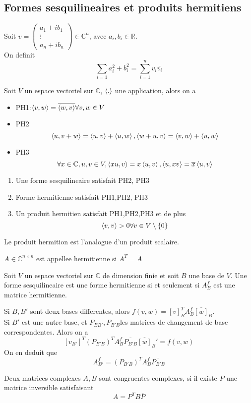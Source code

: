 \documentclass[../main.tex]{subfiles}
\begin{document}
\subsection{Formes sesquilineaires et produits hermitiens}
Soit $v = \begin{pmatrix}
a_1 + ib_1\\ \vdots\\ a_n + i b_n
\end{pmatrix}
\in \mathbb{C}^{n}
$, avec $a_i,b_i \in \mathbb{R}$.\\
On definit
\[ 
\sum_{i=1}^{ } a_i^{2} + b_i^{2} = \sum_{i=1}^{ n} v_i \overline{v_i}
\]
\begin{defn}
Soit $V$ un espace vectoriel sur $\mathbb{C}$, $\left\langle.\right\rangle$ une application, alors on a
\begin{itemize}
\item PH1:$\left\langle v,w\right\rangle = \overline{\left\langle w,v\right\rangle }\forall v,w\in V$ 
\item PH2
	\[ 
	\left\langle u,v+w\right\rangle = \left\langle u,v\right\rangle + \left\langle u,w\right\rangle , \left\langle w+u,v\right\rangle = \left\langle v,w\right\rangle + \left\langle u,w\right\rangle 
	\]
	
\item PH3
\[ 
\forall x \in \mathbb{C}, u,v \in V, \left\langle xu ,v\right\rangle = x\left\langle u,v\right\rangle , \left\langle u,xv\right\rangle = \overline{x} \left\langle u,v\right\rangle 
\]

\end{itemize}
\begin{enumerate}
\item Une forme sesquilineaire satisfait PH2, PH3
\item Forme hermitienne satisfait PH1,PH2, PH3
\item Un produit hermitien satisfait PH1,PH2,PH3 et de plus
	 \[ 
	\left\langle v,v\right\rangle >0 \forall v \in V \setminus \left\{ 0 \right\} 
	\]
	
\end{enumerate}
Le produit hermition est l'analogue d'un produit scalaire.
\end{defn}
\begin{defn}
	$A \in \mathbb{C}^{n \times n} $ est appellee hermitienne si $A^{T}= \overline{A}$
\end{defn}
\begin{propo}
	Soit $V$ un espace vectoriel sur $\mathbb{C}$ de dimension finie et soit $B $ une base de $V$. Une forme sesquilineaire est une forme hermitienne si et seulement si $A_B^{f}$ est une matrice hermitienne.
\end{propo}
Si $B,B'$ sont deux bases differentes, alors $f( v,w) = [ v] _B^{T} A_B^{f}\overline{ [ w] }_B$.\\
Si $B'$ est une autre base, et $P_{BB'} , P_{B'B} $les matrices de changement de base correspondentes.
Alors on a
\[ 
	[ v_{B'} ] ^{T}( P_{B'B} ) ^{T}A_B^{f} \overline{P_{B'B} } \overline{[w]}_B' = f( v,w) 
\]
On en deduit que
\[ 
	A_{B'} ^{f}= ( P_{B'B} ) ^{T} A_B^{f} \overline{P_{B'B} }
\]
\begin{defn}
	Deux matrices complexes $A,B$ sont congruentes complexes, si il existe $P$ une matrice inversible satisfaisant
	\[ 
	A= P^{T}B \overline{P}
	\]
	
\end{defn}
\end{document}
